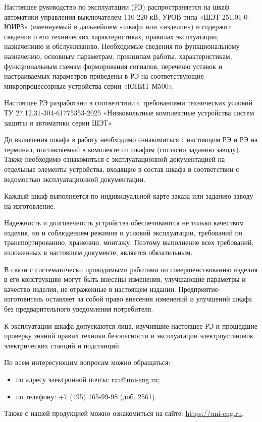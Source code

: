 \par
Настоящее руководство по эксплуатации (РЭ) распространяется на шкаф автоматики управления выключателем 110-220 кВ, УРОВ типа «ШЭТ 251.01-0-ЮИРЗ» (именнуемый в дальнейшем «шкаф» или «изделие») и содержит сведения о его технических характеристиках, правилах эксплуатации, назначениию и обслуживанию.
Необходимые сведения по функциональному назначению, основным параметрам, принципам работы, характеристикам, функциональным схемам формирования сигналов, переченю уставок и настраиваемых параметров приведены в РЭ на соответствующие микропроцессорные устройства серии «ЮНИТ-М500».
\par
Настоящее РЭ разработано в соответствии с требованиями технических условий ТУ 27.12.31-304-61775353-2025 «Низковольтные комплектные устройства систем защиты и автоматики серии ШЭТ»
\par
До включения шкафа в работу необходимо ознакомиться с настоящим РЭ и РЭ на терминал, поставляемый в комплекте со шкафом (согласно заданию заводу). Также необходимо ознакомиться с эксплуатационной документацией на отдельные элементы устройства, входящие в состав шкафа в соответствии с ведомостью эксплуатационной документации.
\par
Каждый шкаф выполняется по индивидуальной карте заказа или заданию заводу на изготовление.
\par
Надежность и долговечность устройства обеспечиваются не только качеством изделия, но и соблюдением режимов и условий эксплуатации, требований по транспортированию, хранению, монтажу. Поэтому выполнение всех требований, изложенных в настоящем документе, является обязательным. 
\par
В связи с систематически проводимыми работами по совершенствованию изделия в его конструкцию могут быть внесены изменения, улучшающие параметры и качество изделия, не отраженные в настоящем издании. Предприятие-изготовитель оставляет за собой право внесения изменений и улучшений шкафа без предварительного уведомления потребителя.

\medskip

\par
К эксплуатации шкафа допускаются лица, изучившие настоящее РЭ и прошедшие проверку знаний правил техники безопасности и эксплуатации электроустановок электрических станций и подстанций.

\medskip

\par
По всем интересующим вопросам можно обращаться:
\begin{itemize}
\item по адресу электронной почты: \href{mailto:rza@uni-eng.ru}{\color{unigreen}\uline{rza@uni-eng.ru}};
\item по телефону: +7 (495) 165-99-98 (доб. 2561).
\end{itemize}
Также с нашей продукцией можно ознакомиться на сайте: \href{https://uni-eng.ru}{\color{unigreen}\uline{https://uni-eng.ru}}.

